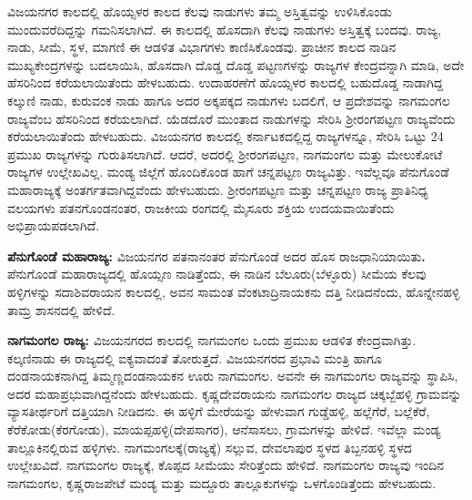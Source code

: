 ವಿಜಯನಗರ ಕಾಲದಲ್ಲಿ ಹೊಯ್ಸಳರ ಕಾಲದ ಕೆಲವು ನಾಡುಗಳು ತಮ್ಮ ಅಸ್ತಿತ್ವವನ್ನು ಉಳಿಸಿಕೊಂಡು ಮುಂದುವರೆದಿದ್ದನ್ನು ಗಮನಿಸಲಾಗಿದೆ. ಈ ಕಾಲದಲ್ಲಿ ಹೊಸದಾಗಿ ಕೆಲವು ನಾಡುಗಳು ಅಸ್ತಿತ್ವಕ್ಕೆ ಬಂದವು. ರಾಜ್ಯ, ನಾಡು, ಸೀಮೆ, ಸ್ಥಳ, ಮಾಗಣಿ ಈ ಆಡಳಿತ ವಿಭಾಗಗಳು ಕಾಣಿಸಿಕೊಂಡವು. ಪ್ರಾಚೀನ ಕಾಲದ ನಾಡಿನ ಮುಖ್ಯಕೇಂದ್ರಗಳನ್ನು ಬದಲಾಯಿಸಿ, ಹೊಸದಾಗಿ ದೊಡ್ಡ ದೊಡ್ಡ ಪಟ್ಟಣಗಳನ್ನು ರಾಜ್ಯಗಳ ಕೇಂದ್ರವನ್ನಾಗಿ ಮಾಡಿ, ಅದೇ ಹೆಸರಿನಿಂದ ಕರೆಯಲಾಯಿತೆಂದು ಹೇಳಬಹುದು. ಉದಾಹರಣೆಗೆ ಹೊಯ್ಸಳರ ಕಾಲದಲ್ಲಿ ಬಹುದೊಡ್ಡ ನಾಡಾಗಿದ್ದ ಕಲ್ಕುಣಿ ನಾಡು, ಕುರುವಂಕ ನಾಡು ಹಾಗೂ ಅದರ ಅಕ್ಕಪಕ್ಕದ ನಾಡುಗಳು ಬದಲಿಗೆ, ಆ ಪ್ರದೇಶವನ್ನು ನಾಗಮಂಗಲ ರಾಜ್ಯವೆಂಬ ಹೆಸರಿನಿಂದ ಕರೆಯಲಾಗಿದೆ. ಯೆಡದೊರೆ ಮುಂತಾದ ನಾಡುಗಳನ್ನು ಸೇರಿಸಿ ಶ‍್ರೀರಂಗಪಟ್ಟಣ ರಾಜ್ಯವೆಂದು ಕರೆಯಲಾಯಿತೆಂದು ಹೇಳಬಹುದು. ವಿಜಯನಗರ ಕಾಲದಲ್ಲಿ ಕರ್ನಾಟಕದಲ್ಲಿದ್ದ ರಾಜ್ಯಗಳನ್ನೂ, ಸೇರಿಸಿ ಒಟ್ಟು 24 ಪ್ರಮುಖ ರಾಜ್ಯಗಳನ್ನು ಗುರುತಿಸಲಾಗಿದೆ. ಆದರೆ, ಅದರಲ್ಲಿ ಶ‍್ರೀರಂಗಪಟ್ಟಣ, ನಾಗಮಂಗಲ ಮತ್ತು ಮೇಲುಕೋಟೆ ರಾಜ್ಯಗಳ ಉಲ್ಲೇಖವಿಲ್ಲ. ಮಂಡ್ಯ ಜಿಲ್ಲೆಗೆ ಹೊಂದಿಕೊಂಡ ಹಾಗೆ ಚನ್ನಪಟ್ಟಣ ರಾಜ್ಯವಿತ್ತು. ಇವೆಲ್ಲವೂ ಪೆನುಗೊಂಡೆ ಮಹಾರಾಜ್ಯಕ್ಕೆ ಅಂತರ್ಗತವಾಗಿದ್ದವೆಂದು ಹೇಳಬಹುದು. ಶ‍್ರೀರಂಗಪಟ್ಟಣ ಮತ್ತು ಚನ್ನಪಟ್ಟಣ ರಾಜ್ಯ ಪ್ರಾತಿನಿಧ್ಯ ವಲಯಗಳು ಪತನಗೊಂಡನಂತರ, ರಾಜಕೀಯ ರಂಗದಲ್ಲಿ ಮೈಸೂರು ಶಕ್ತಿಯ ಉದಯವಾಯಿತೆಂದು ಅಭಿಪ್ರಾಯಪಡಲಾಗಿದೆ.

\textbf{ಪೆನುಗೊಂಡೆ ಮಹಾರಾಜ್ಯ:} ವಿಜಯನಗರ ಪತನಾನಂತರ ಪೆನುಗೊಂಡೆ ಅದರ ಹೊಸ ರಾಜಧಾನಿಯಾಯಿತು\textbf{. }ಪೆನುಗೊಂಡೆ ಮಹಾರಾಜ್ಯದಲ್ಲಿ ಹೊಯ್ಸಣ ನಾಡಿತ್ತೆಂದು, ಈ ನಾಡಿನ ಬೆಲೂರು(ಬೆಳ್ಳೂರು) ಸೀಮೆಯ ಕೆಲವು ಹಳ್ಳಿಗಳನ್ನು ಸದಾಶಿವರಾಯನ ಕಾಲದಲ್ಲಿ, ಅವನ ಸಾಮಂತ ವೆಂಕಟಾದ್ರಿನಾಯಕನು ದತ್ತಿ ನೀಡಿದನೆಂದು, ಹೊನ್ನೇನಹಳ್ಳಿ ತಾಮ್ರ ಶಾಸನದಲ್ಲಿ ಹೇಳಿದೆ.

\textbf{ನಾಗಮಂಗಲ ರಾಜ್ಯ:} ವಿಜಯನಗರದ ಕಾಲದಲ್ಲಿ ನಾಗಮಂಗಲ ಒಂದು ಪ್ರಮುಖ ಆಡಳಿತ ಕೇಂದ್ರವಾಗಿತ್ತು. ಕಲ್ಕಣಿನಾಡು ಈ ರಾಜ್ಯದಲ್ಲಿ ಐಕ್ಯವಾದಂತೆ ತೋರುತ್ತದೆ. ವಿಜಯನಗರದ ಪ್ರಭಾವಿ ಮಂತ್ರಿ ಹಾಗೂ ದಂಡನಾಯಕನಾಗಿದ್ದ ತಿಮ್ಮಣ್ಣದಂಡನಾಯಕನ ಊರು ನಾಗಮಂಗಲ. ಅವನೇ ಈ ನಾಗಮಂಗಲ ರಾಜ್ಯವನ್ನು ಸ್ಥಾಪಿಸಿ, ಅದರ ಮಹಾಪ್ರಭು\-ವಾಗಿದ್ದನೆಂದು ಹೇಳಬಹುದು. ಕೃಷ್ಣದೇವರಾಯನು ನಾಗಮಂಗಲ ರಾಜ್ಯದ ಚಿಕ್ಕಬ್ಬೆಹಳ್ಳಿ ಗ್ರಾಮವನ್ನು ವ್ಯಾಸತೀರ್ಥರಿಗೆ ದತ್ತಿಯಾಗಿ ನೀಡಿದನು. ಈ ಹಳ್ಳಿಗೆ ಮೇರೆಯನ್ನು ಹೇಳುವಾಗ ಗುಡ್ಡೆಹಳ್ಳಿ, ಹಲ್ಲೆಗೆರೆ, ಬಲ್ಲೆಕೆರೆ, ಕೆರೆಕೋಡು(ಕೆರಗೋಡು), ಮಾಯಪ್ಪಹಳ್ಳಿ(ದೇಪಸಾಗರ), ಆನೆಸಾಸಲು, ಗ್ರಾಮಗಳನ್ನು ಹೇಳಿದೆ. ಇವೆಲ್ಲಾ ಮಂಡ್ಯ ತಾಲ್ಲೂಕಿನಲ್ಲಿರುವ ಹಳ್ಳಿಗಳು. ನಾಗಮಂಗಲಕ್ಕೆ(ರಾಜ್ಯಕ್ಕೆ) ಸಲ್ಲುವ, ದೇವಲಾಪುರ ಸ್ಥಳದ ತಿಬ್ಬನಹಳ್ಳಿ ಸ್ಥಳದ ಉಲ್ಲೇಖವಿದೆ. ನಾಗಮಂಗಲ ರಾಜ್ಯಕ್ಕೆ, ಕೊಪ್ಪದ ಸೀಮೆಯು ಸೇರಿತ್ತೆಂದು ಹೇಳಿದೆ. ನಾಗಮಂಗಲ ರಾಜ್ಯವು ಇಂದಿನ ನಾಗಮಂಗಲ, ಕೃಷ್ಣರಾಜಪೇಟೆ ಮಂಡ್ಯ ಮತ್ತು ಮದ್ದೂರು ತಾಲ್ಲೂಕುಗಳನ್ನು ಒಳಗೊಂಡಿತ್ತೆಂದು ಹೇಳಬಹುದು.

